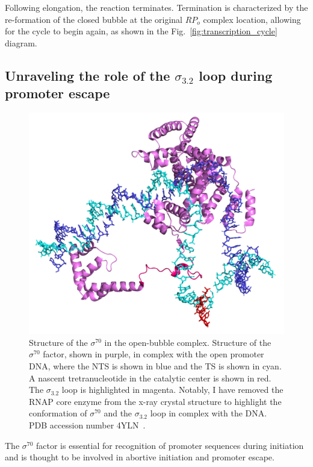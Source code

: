 Following elongation, the reaction terminates.
Termination is characterized by the re-formation of the closed bubble at the original $RP_o$ complex location, allowing for the cycle to begin again, as shown in the Fig.~\ref{fig:transcription_cycle} diagram.

\subsection{\label{sec:promoter_escape} 
Unraveling the role of the $\sigma_{3.2}$ loop during promoter escape}

\begin{figure}
    \centering
    \includegraphics[width=\textwidth]{chapters/figures/sigma_structure.jpg}
    \caption{\label{fig:sigma_structure} 
    Structure of the $\sigma^{70}$ in the open-bubble complex.
    Structure of the $\sigma^{70}$ factor, shown in purple, in complex with the open promoter DNA, where the \ac{NTS} is shown in blue and the \ac{TS} is shown in cyan.
    A nascent tretranucleotide in the catalytic center is shown in red.
    The $\sigma_{3.2}$ loop is highlighted in magenta.
    Notably, I have removed the RNAP core enzyme from the x-ray crystal structure to highlight the conformation of $\sigma^{70}$ and the $\sigma_{3.2}$ loop in complex with the DNA.
    \ac{PDB} accession number 4YLN~\cite{zuo_steitz_2015}.
    }
\end{figure}

The $\sigma^{70}$ factor is essential for recognition of promoter sequences during initiation and is thought to be involved in abortive initiation and promoter escape. 

